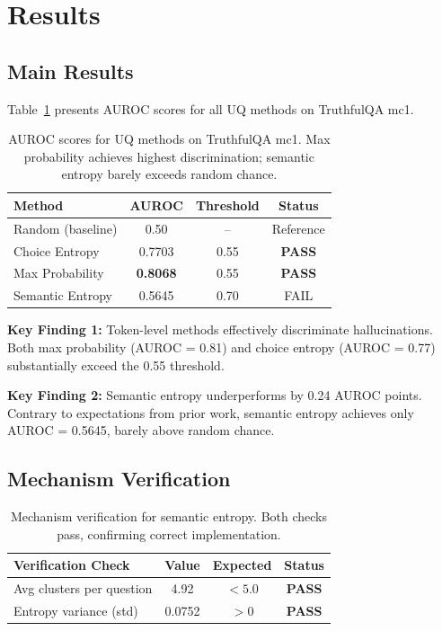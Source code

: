 \section{Results}
\label{sec:results}

\subsection{Main Results}

Table~\ref{tab:main} presents AUROC scores for all UQ methods on TruthfulQA mc1.

\begin{table}[h]
\centering
\begin{tabular}{lccc}
\toprule
\textbf{Method} & \textbf{AUROC} & \textbf{Threshold} & \textbf{Status} \\
\midrule
Random (baseline) & 0.50 & -- & Reference \\
Choice Entropy & 0.7703 & 0.55 & \textbf{PASS} \\
Max Probability & \textbf{0.8068} & 0.55 & \textbf{PASS} \\
Semantic Entropy & 0.5645 & 0.70 & FAIL \\
\bottomrule
\end{tabular}
\caption{AUROC scores for UQ methods on TruthfulQA mc1. Max probability achieves highest discrimination; semantic entropy barely exceeds random chance.}
\label{tab:main}
\end{table}

\textbf{Key Finding 1:} Token-level methods effectively discriminate hallucinations. Both max probability (AUROC = 0.81) and choice entropy (AUROC = 0.77) substantially exceed the 0.55 threshold.

\textbf{Key Finding 2:} Semantic entropy underperforms by 0.24 AUROC points. Contrary to expectations from prior work, semantic entropy achieves only AUROC = 0.5645, barely above random chance.

\subsection{Mechanism Verification}

\begin{table}[h]
\centering
\begin{tabular}{lccc}
\toprule
\textbf{Verification Check} & \textbf{Value} & \textbf{Expected} & \textbf{Status} \\
\midrule
Avg clusters per question & 4.92 & $< 5.0$ & \textbf{PASS} \\
Entropy variance (std) & 0.0752 & $> 0$ & \textbf{PASS} \\
\bottomrule
\end{tabular}
\caption{Mechanism verification for semantic entropy. Both checks pass, confirming correct implementation.}
\label{tab:verification}
\end{table}

